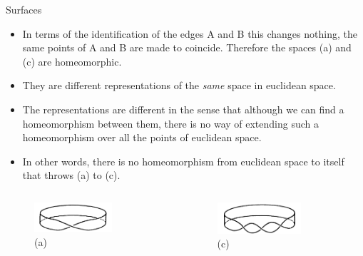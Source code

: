 \documentclass{beamer}
\begin{document}
\begin{frame}{Surfaces}
  \begin{block}{}
    \begin{itemize}
    \item In terms of the identification of the edges A and B this changes nothing, the same points of A and B are made to coincide. Therefore the spaces (a) and (c) are homeomorphic.
    \item They are different representations of the \textsl{same} space in euclidean space.
    \item The representations are different in the sense that although we can find a homeomorphism between them, there is no way of extending such a homeomorphism over all the points of euclidean space.
    \item In other words, there is no homeomorphism from euclidean space to itself that throws (a) to (c).
    \end{itemize}
  \end{block}
  \begin{columns}
    \begin{column}{0.5\textwidth}
      \begin{figure}
        \centering
        \includegraphics[width=0.7\textwidth]{figure_1_14_a.png}
        \caption{(a)}
      \end{figure}
    \end{column}
    \begin{column}{0.5\textwidth}
      \begin{figure}
        \centering
        \includegraphics[width=0.7\textwidth]{figure_1_14_c.png}
        \caption{(c)}
      \end{figure}
    \end{column}
  \end{columns}
\end{frame}
\end{document}
